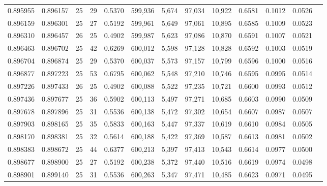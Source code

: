 \begin{tabular}{rrrrrrrrrrrrr}
0.895955 & 0.896157 &    25 &  29 &                                     0.5370 & 599,936 &   5,674 &  97,034 &  10,922 & 0.6581 & 0.1012 & 0.0526 \\
0.896159 & 0.896301 &    25 &  27 &                                     0.5192 & 599,961 &   5,649 &  97,061 &  10,895 & 0.6585 & 0.1009 & 0.0523 \\
0.896310 & 0.896457 &    26 &  25 &                                     0.4902 & 599,987 &   5,623 &  97,086 &  10,870 & 0.6591 & 0.1007 & 0.0521 \\
0.896463 & 0.896702 &    25 &  42 &                                     0.6269 & 600,012 &   5,598 &  97,128 &  10,828 & 0.6592 & 0.1003 & 0.0519 \\
0.896704 & 0.896874 &    25 &  29 &                                     0.5370 & 600,037 &   5,573 &  97,157 &  10,799 & 0.6596 & 0.1000 & 0.0516 \\
0.896877 & 0.897223 &    25 &  53 &                                     0.6795 & 600,062 &   5,548 &  97,210 &  10,746 & 0.6595 & 0.0995 & 0.0514 \\
0.897226 & 0.897433 &    26 &  25 &                                     0.4902 & 600,088 &   5,522 &  97,235 &  10,721 & 0.6600 & 0.0993 & 0.0512 \\
0.897436 & 0.897677 &    25 &  36 &                                     0.5902 & 600,113 &   5,497 &  97,271 &  10,685 & 0.6603 & 0.0990 & 0.0509 \\
0.897678 & 0.897896 &    25 &  31 &                                     0.5536 & 600,138 &   5,472 &  97,302 &  10,654 & 0.6607 & 0.0987 & 0.0507 \\
0.897903 & 0.898165 &    25 &  35 &                                     0.5833 & 600,163 &   5,447 &  97,337 &  10,619 & 0.6610 & 0.0984 & 0.0505 \\
0.898170 & 0.898381 &    25 &  32 &                                     0.5614 & 600,188 &   5,422 &  97,369 &  10,587 & 0.6613 & 0.0981 & 0.0502 \\
0.898383 & 0.898672 &    25 &  44 &                                     0.6377 & 600,213 &   5,397 &  97,413 &  10,543 & 0.6614 & 0.0977 & 0.0500 \\
0.898677 & 0.898900 &    25 &  27 &                                     0.5192 & 600,238 &   5,372 &  97,440 &  10,516 & 0.6619 & 0.0974 & 0.0498 \\
0.898901 & 0.899140 &    25 &  31 &                                     0.5536 & 600,263 &   5,347 &  97,471 &  10,485 & 0.6623 & 0.0971 & 0.0495 \\

\end{tabular}
